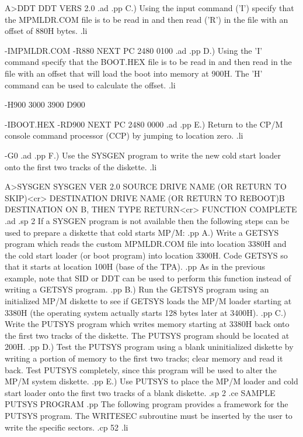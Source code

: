                A>DDT
               DDT VERS 2.0
.ad
.pp
C.)  Using the input command ('I') specify that the MPMLDR.COM
file is to be read in and then read ('R') in the file with an
offset of 880H bytes.
.li

               -IMPMLDR.COM
               -R880
               NEXT  PC
               2480 0100
.ad
.pp
D.)  Using the 'I' command specify that the BOOT.HEX file is to
be read in and then read in the file with an offset that will load
the boot into memory at 900H.  The 'H' command can be used to
calculate the offset.
.li

               -H900 3000
               3900 D900

               -IBOOT.HEX
               -RD900
               NEXT  PC
               2480 0000
.ad
.pp
E.)  Return to the CP/M console command processor (CCP) by
jumping to location zero.
.li

               -G0
.ad
.pp
F.)  Use the SYSGEN program to write the new cold start loader
onto the first two tracks of the diskette.
.li

               A>SYSGEN
               SYSGEN VER 2.0
               SOURCE DRIVE NAME (OR RETURN TO SKIP)<cr>
               DESTINATION DRIVE NAME (OR RETURN TO REBOOT)B
               DESTINATION ON B, THEN TYPE RETURN<cr>
               FUNCTION COMPLETE
.ad
.sp 2
If a SYSGEN program is not available then the following steps can
be used to prepare a diskette that cold starts MP/M:
.pp
A.)  Write a GETSYS program which reads the
custom MPMLDR.COM file into location 3380H and the cold start
loader (or boot program) into location 3300H.
Code GETSYS so that it starts
at location 100H (base of the TPA).
.pp
As in the previous example, note that SID or DDT can be used to
perform this function instead of writing a GETSYS program.
.pp
B.)  Run the GETSYS program using an initialized MP/M diskette to see
if GETSYS loads the MP/M loader starting at 3380H (the operating
system actually
starts 128 bytes later at 3400H).
.pp
C.)  Write the PUTSYS program which writes
memory starting at 3380H back onto the first two tracks of the
diskette.  The PUTSYS program should be located at 200H.
.pp
D.)  Test the PUTSYS program using a blank uninitialized diskette by
writing a portion of memory to the first two tracks; clear memory
and read it back.  Test PUTSYS completely, since this program will
be used to alter the MP/M system diskette.
.pp
E.)  Use PUTSYS to place the MP/M loader and cold start loader
onto the first two tracks of a blank diskette.
.sp 2
.ce
SAMPLE PUTSYS PROGRAM
.pp
The following program provides a framework for the PUTSYS program.
The WRITESEC subroutine must be inserted by the user to write the
specific sectors.
.cp 52
.li



